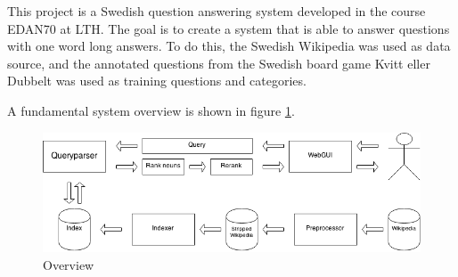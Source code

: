 This project is a Swedish question answering system developed in the course EDAN70 at LTH.
The goal is to create a system that is able to answer questions with one word long answers.
To do this, the Swedish Wikipedia was used as data source, and the annotated questions from the Swedish 
board game Kvitt eller Dubbelt was used as training questions and categories.

A fundamental system overview is shown in figure \ref{fig:overview}. 

\begin{figure}
\centering
\includegraphics[width=1\textwidth]{figures/Question-answering-system.png}
\caption{Overview}
\label{fig:overview}
\end{figure}
